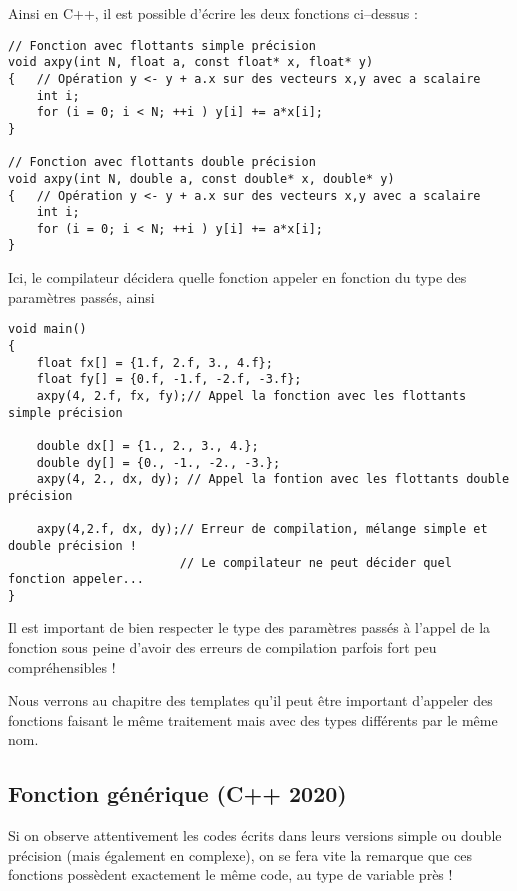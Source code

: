 Ainsi en C++, il est possible d'écrire les deux fonctions ci--dessus :

\begin{lstlisting}[caption=Exemple de surcharge d'une fonction C++]
// Fonction avec flottants simple précision
void axpy(int N, float a, const float* x, float* y)
{   // Opération y <- y + a.x sur des vecteurs x,y avec a scalaire
    int i;
    for (i = 0; i < N; ++i ) y[i] += a*x[i];
}

// Fonction avec flottants double précision
void axpy(int N, double a, const double* x, double* y)
{   // Opération y <- y + a.x sur des vecteurs x,y avec a scalaire
    int i;
    for (i = 0; i < N; ++i ) y[i] += a*x[i];
}
\end{lstlisting}

Ici, le compilateur décidera quelle fonction appeler en fonction du type des paramètres passés, ainsi
\begin{lstlisting}[caption=Appel à des fonctions surchargées]
void main()
{
    float fx[] = {1.f, 2.f, 3., 4.f};
    float fy[] = {0.f, -1.f, -2.f, -3.f};
    axpy(4, 2.f, fx, fy);// Appel la fonction avec les flottants simple précision

    double dx[] = {1., 2., 3., 4.};
    double dy[] = {0., -1., -2., -3.};
    axpy(4, 2., dx, dy); // Appel la fontion avec les flottants double précision

    axpy(4,2.f, dx, dy);// Erreur de compilation, mélange simple et double précision !
                        // Le compilateur ne peut décider quel fonction appeler...
}
\end{lstlisting}

Il est important de bien respecter le type des paramètres passés à l'appel de la fonction sous peine d'avoir des erreurs de compilation parfois fort peu compréhensibles !

Nous verrons au chapitre des templates qu'il peut être important d'appeler des fonctions faisant le même traitement mais avec des types différents par le même nom.

\subsection{Fonction générique (C++ 2020)}

Si on observe attentivement les codes écrits dans leurs versions simple ou double précision
(mais également en complexe), on se fera vite la remarque que ces fonctions possèdent exactement le même code, au type de variable près !

